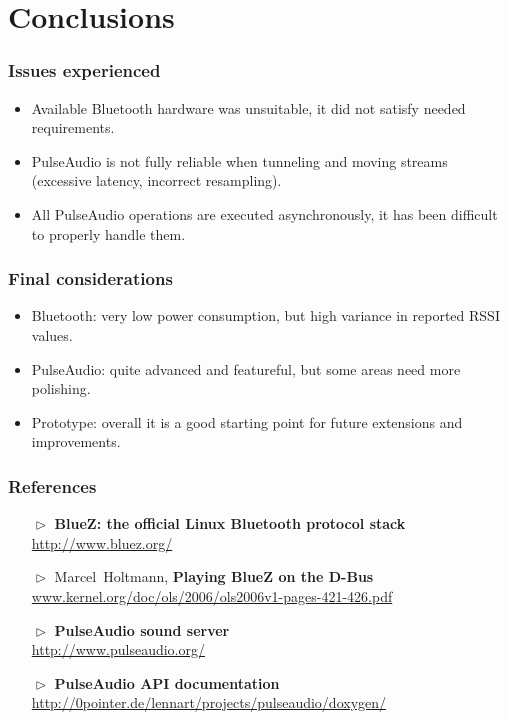 \documentclass{beamer}
\begin{document}

\section{Conclusions}

\begin{frame}
\frametitle{Issues experienced}
\begin{itemize}
	\item Available Bluetooth hardware was unsuitable, it did not satisfy needed requirements.
	\pause
	\item PulseAudio is not fully reliable when tunneling and moving streams (excessive latency, incorrect resampling).
	\pause
	\item All PulseAudio operations are executed asynchronously, it has been difficult to properly handle them.
\end{itemize}
\end{frame}

\begin{frame}
\frametitle{Final considerations}
\begin{itemize}
	\item Bluetooth: very low power consumption, but high variance in reported RSSI values.
	\item PulseAudio: quite advanced and featureful, but some areas need more polishing.
	\item Prototype: overall it is a good starting point for future extensions and improvements.
\end{itemize}
\end{frame}


\appendix

\begin{frame}
\frametitle{References}
\begin{itemize}
	\item[$\vartriangleright$] \textbf{BlueZ: the official Linux Bluetooth protocol stack} \\
			{\footnotesize\url{http://www.bluez.org/}}
	\item[$\vartriangleright$] Marcel~Holtmann, \textbf{Playing BlueZ on the D-Bus} \\
			{\footnotesize\url{www.kernel.org/doc/ols/2006/ols2006v1-pages-421-426.pdf}}
	\item[$\vartriangleright$] \textbf{PulseAudio sound server} \\
			{\footnotesize\url{http://www.pulseaudio.org/}}
	\item[$\vartriangleright$] \textbf{PulseAudio API documentation} \\
			{\footnotesize\url{http://0pointer.de/lennart/projects/pulseaudio/doxygen/}}
\end{itemize}
\end{frame}
\end{document}

